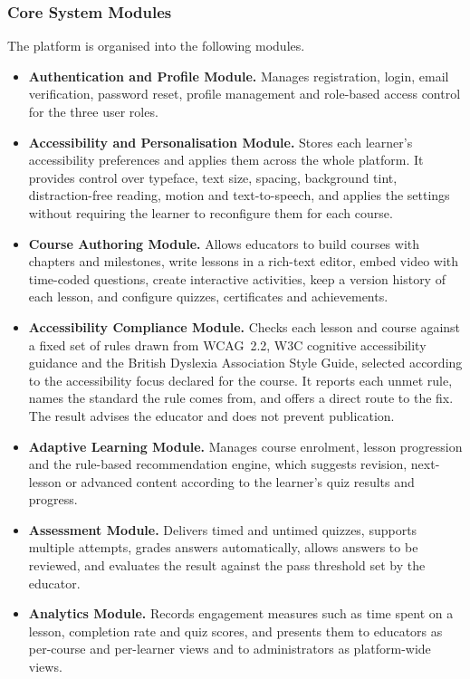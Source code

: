 \documentclass[12pt, oneside]{article} %
\begin{document}
\subsubsection{Core System Modules}
The platform is organised into the following modules.

\begin{itemize}
    \item \textbf{Authentication and Profile Module.} Manages registration, login, email verification, password reset, profile management and role-based access control for the three user roles.
    \item \textbf{Accessibility and Personalisation Module.} Stores each learner's accessibility preferences and applies them across the whole platform. It provides control over typeface, text size, spacing, background tint, distraction-free reading, motion and text-to-speech, and applies the settings without requiring the learner to reconfigure them for each course.
    \item \textbf{Course Authoring Module.} Allows educators to build courses with chapters and milestones, write lessons in a rich-text editor, embed video with time-coded questions, create interactive activities, keep a version history of each lesson, and configure quizzes, certificates and achievements.
    \item \textbf{Accessibility Compliance Module.} Checks each lesson and course against a fixed set of rules drawn from WCAG~2.2, W3C cognitive accessibility guidance and the British Dyslexia Association Style Guide, selected according to the accessibility focus declared for the course. It reports each unmet rule, names the standard the rule comes from, and offers a direct route to the fix. The result advises the educator and does not prevent publication.
    \item \textbf{Adaptive Learning Module.} Manages course enrolment, lesson progression and the rule-based recommendation engine, which suggests revision, next-lesson or advanced content according to the learner's quiz results and progress.
    \item \textbf{Assessment Module.} Delivers timed and untimed quizzes, supports multiple attempts, grades answers automatically, allows answers to be reviewed, and evaluates the result against the pass threshold set by the educator.
    \item \textbf{Analytics Module.} Records engagement measures such as time spent on a lesson, completion rate and quiz scores, and presents them to educators as per-course and per-learner views and to administrators as platform-wide views.

\end{itemize}
\end{document}
